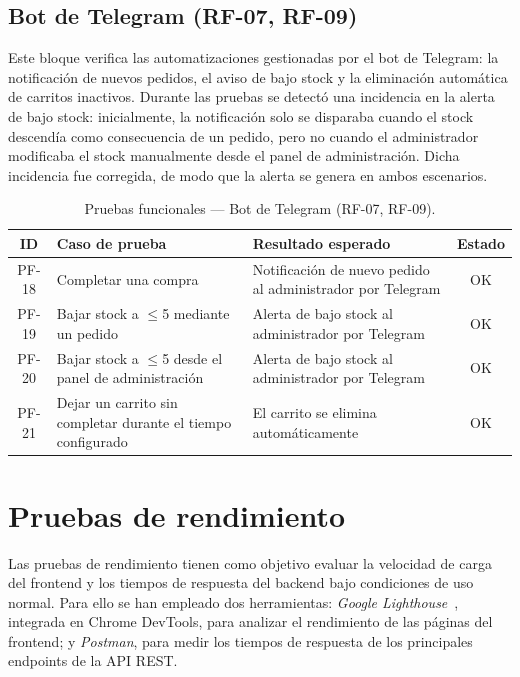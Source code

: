 \subsection{Bot de Telegram (RF-07, RF-09)}

Este bloque verifica las automatizaciones gestionadas por el bot de Telegram: la notificación de nuevos pedidos, el aviso de bajo stock y la eliminación automática de carritos inactivos. Durante las pruebas se detectó una incidencia en la alerta de bajo stock: inicialmente, la notificación solo se disparaba cuando el stock descendía como consecuencia de un pedido, pero no cuando el administrador modificaba el stock manualmente desde el panel de administración. Dicha incidencia fue corregida, de modo que la alerta se genera en ambos escenarios.

\begin{table}[H]
\centering
\begin{tabular}{|c|L{5.5cm}|L{6cm}|c|}
\hline
\textbf{ID} & \textbf{Caso de prueba} & \textbf{Resultado esperado} & \textbf{Estado} \\
\hline
PF-18 & Completar una compra & Notificación de nuevo pedido al administrador por Telegram & OK \\
\hline
PF-19 & Bajar stock a $\leq$5 mediante un pedido & Alerta de bajo stock al administrador por Telegram & OK \\
\hline
PF-20 & Bajar stock a $\leq$5 desde el panel de administración & Alerta de bajo stock al administrador por Telegram & OK \\
\hline
PF-21 & Dejar un carrito sin completar durante el tiempo configurado & El carrito se elimina automáticamente & OK \\
\hline
\end{tabular}
\caption{Pruebas funcionales — Bot de Telegram (RF-07, RF-09).}
\label{tab:pf-rf07-09}
\end{table}

\section{Pruebas de rendimiento}

Las pruebas de rendimiento tienen como objetivo evaluar la velocidad de carga del frontend y los tiempos de respuesta del backend bajo condiciones de uso normal. Para ello se han empleado dos herramientas: \textit{Google Lighthouse}~\cite{lighthouseDocs}, integrada en Chrome DevTools, para analizar el rendimiento de las páginas del frontend; y \textit{Postman}, para medir los tiempos de respuesta de los principales endpoints de la API REST.


